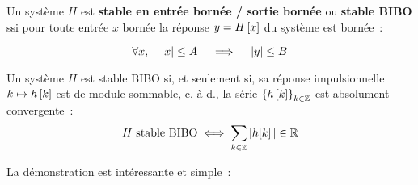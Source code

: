 \begin{definition} Un système $H$ est \textbf{stable en entrée bornée
    / sortie bornée} ou \textbf{stable BIBO} ssi pour toute entrée $x$
  bornée la réponse $y=H\left[x\right]$ du système est bornée~:

  $$\forall x, \quad \left|x\right|\leq A \quad\implies\quad \left|y\right|\leq B $$
\end{definition}


\begin{theoreme}
  Un système $H$ est stable BIBO si, et seulement si, sa réponse
  impulsionnelle $k\mapsto h\left[k\right]$ est de module sommable, c.-à-d., la
  série $\left\{h\left[k\right]\right\}_{k\in\mathbb{Z}}$ est absolument convergente~:
  $$ H \text{ stable BIBO} \iff\sum\limits_{k\in\mathbb{Z}} |h\!\left[k\right]| \in \mathbb{R}$$
\end{theoreme}

La démonstration est intéressante et simple~:

